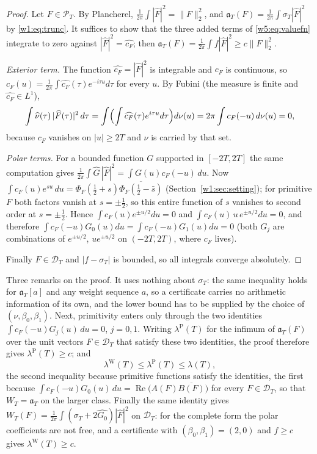 \documentclass[11pt]{amsart}
\theoremstyle{definition}
\theoremstyle{remark}
\numberwithin{equation}{section}
\DeclareMathOperator{\Rel}{Re}
\newcommand{\Fh}{\widehat F}                           %
\newcommand{\cF}{c_F}                                  %
\newcommand{\PhiF}{\Phi_F}                             %
\newcommand{\PT}{\mathcal{P}_T}                        %
\newcommand{\DT}{\mathcal{D}_T}                        %
\newcommand{\aT}{\mathfrak{a}_T}                       %
\newcommand{\WT}{W_T}                                  %
\newcommand{\sT}{\sigma_T}                             %
\newcommand{\lam}{\lambda(T)}                          %
\newcommand{\lamW}{\lambda^{\mathrm W}(T)}             %
\begin{document}
\begin{proof}
Let $F\in\PT$. By Plancherel, $\frac1{2\pi}\int|\Fh|^2=\|F\|_2^2$, and $\aT(F)=\frac1{2\pi}\int\sT|\Fh|^2$ by
\eqref{w1:eq:trunc}. It suffices to show that the three added terms of \eqref{w5:eq:valuefn} integrate to zero against
$|\Fh|^2=\widehat{\cF}$; then $\aT(F)=\frac1{2\pi}\int f|\Fh|^2\ge c\|F\|_2^2$.

\emph{Exterior term.} The function $\widehat{\cF}=|\Fh|^2$ is integrable and $\cF$ is continuous, so
$\cF(u)=\frac1{2\pi}\int\widehat{\cF}(\tau)e^{-i\tau u}d\tau$ for every $u$. By Fubini (the measure is finite and
$\widehat{\cF}\in L^1$),
\[
  \int\widehat\nu(\tau)\,|\Fh(\tau)|^2\,d\tau=\int\Bigl(\int\widehat{\cF}(\tau)e^{i\tau u}d\tau\Bigr)d\nu(u)
  =2\pi\int\cF(-u)\,d\nu(u)=0,
\]
because $\cF$ vanishes on $|u|\ge2T$ and $\nu$ is carried by that set.

\emph{Polar terms.} For a bounded function $G$ supported in $[-2T,2T]$ the same computation gives
$\frac1{2\pi}\int\widehat G\,|\Fh|^2=\int G(u)\cF(-u)\,du$. Now
$\int\cF(u)e^{su}\,du=\PhiF(\tfrac12+s)\overline{\PhiF(\tfrac12-\bar s)}$ (Section~\ref{w1:sec:setting}); for primitive $F$
both factors vanish at $s=\pm\frac12$, so this entire function of $s$ vanishes to second order at $s=\pm\frac12$. Hence
$\int\cF(u)e^{\pm u/2}du=0$ and $\int\cF(u)\,u\,e^{\pm u/2}du=0$, and therefore
$\int\cF(-u)G_0(u)du=\int\cF(-u)G_1(u)du=0$ (both $G_j$ are combinations of $e^{\pm u/2}$, $ue^{\pm u/2}$ on
$(-2T,2T)$, where $\cF$ lives).

Finally $F\in\DT$ and $|f-\sT|$ is bounded, so all integrals converge absolutely.
\end{proof}

Three remarks on the proof. It uses nothing about $\sT$: the same inequality holds for $\aT[a]$ and any weight sequence
$a$, so a certificate carries no arithmetic information of its own, and the lower bound has to be supplied by the choice
of $(\nu,\beta_0,\beta_1)$. Next, primitivity enters only through the two identities $\int\cF(-u)G_j(u)\,du=0$, $j=0,1$.
Writing $\lambda^{\mathrm P}(T)$ for the infimum of $\aT(F)$ over the unit vectors $F\in\DT$ that satisfy these two
identities, the proof therefore gives $\lambda^{\mathrm P}(T)\ge c$; and
\[
  \lamW\le\lambda^{\mathrm P}(T)\le\lam ,
\]
the second inequality because primitive functions satisfy the identities, the first because
$\int\cF(-u)G_0(u)\,du=\Rel\bigl(A(F)\overline{B(F)}\bigr)$ for every $F\in\DT$, so that $\WT=\aT$ on the larger class.
Finally the same identity gives $\WT(F)=\frac1{2\pi}\int(\sT+2\widehat{G_0})|\Fh|^2$ on $\DT$: for the complete form the
polar coefficients are not free, and a certificate with $(\beta_0,\beta_1)=(2,0)$ and $f\ge c$ gives $\lamW\ge c$.
\end{document}

